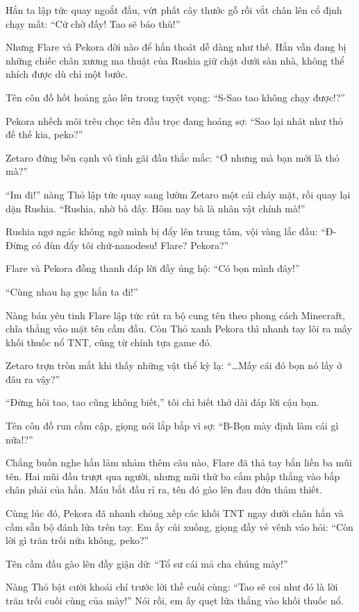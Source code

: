 \documentclass[../main.tex]{subfiles}
\begin{document}
Hắn ta lập tức quay ngoắt đầu, vứt phất cây thước gỗ rồi vắt chân lên cổ định chạy mất: ``Cứ chờ đấy! Tao sẽ báo thù!''

Nhưng Flare và Pekora đời nào để hắn thoát dễ dàng như thế. Hắn vẫn đang bị những chiếc chân xương ma thuật của Rushia giữ chặt dưới sàn nhà, không thể nhích được dù chỉ một bước.

Tên côn đồ hốt hoảng gào lên trong tuyệt vọng: ``S-Sao tao không chạy được!?''

Pekora nhếch môi trêu chọc tên đầu trọc đang hoảng sợ: ``Sao lại nhát như thỏ đế thế kia, peko?''

Zetaro đứng bên cạnh vô tình gãi đầu thắc mắc: ``Ơ nhưng mà bạn mới là thỏ mà?''

``Im đi!'' nàng Thỏ lập tức quay sang lườm Zetaro một cái cháy mặt, rồi quay lại dặn Rushia. ``Rushia, nhờ bà đấy. Hôm nay bà là nhân vật chính mà!''

Rushia ngơ ngác không ngờ mình bị đẩy lên trung tâm, vội vàng lắc đầu: ``Đ-Đừng có đùn đẩy tôi chứ-nanodesu! Flare? Pekora?''

Flare và Pekora đồng thanh đáp lời đầy ủng hộ: ``Có bọn mình đây!''

``Cùng nhau hạ gục hắn ta đi!''

Nàng bán yêu tinh Flare lập tức rút ra bộ cung tên theo phong cách Minecraft, chĩa thẳng vào mặt tên cầm đầu. Còn Thỏ xanh Pekora thì nhanh tay lôi ra mấy khối thuốc nổ TNT, cũng từ chính tựa game đó.

Zetaro trợn tròn mắt khi thấy những vật thể kỳ lạ: ``\dots Mấy cái đó bọn nó lấy ở đâu ra vậy?''

``Đừng hỏi tao, tao cũng không biết,'' tôi chỉ biết thở dài đáp lời cậu bạn.

Tên côn đồ run cầm cập, giọng nói lắp bắp vì sợ: ``B-Bọn mày định làm cái gì nữa!?''

Chẳng buồn nghe hắn lảm nhảm thêm câu nào, Flare đã thả tay bắn liền ba mũi tên. Hai mũi đầu trượt qua người, nhưng mũi thứ ba cắm phập thẳng vào bắp chân phải của hắn. Máu bắt đầu rỉ ra, tên đó gào lên đau đớn thảm thiết.

Cùng lúc đó, Pekora đã nhanh chóng xếp các khối TNT ngay dưới chân hắn và cầm sẵn bộ đánh lửa trên tay. Em ấy cúi xuống, giọng đầy vẻ vênh váo hỏi: ``Còn lời gì trăn trối nữa không, peko?''

Tên cầm đầu gào lên đầy giận dữ: ``Tổ sư cái mả cha chúng mày!''

Nàng Thỏ bật cười khoái chí trước lời thề cuối cùng: ``Tao sẽ coi như đó là lời trăn trối cuối cùng của mày!'' Nói rồi, em ấy quẹt lửa thẳng vào khối thuốc nổ.
\end{document}
